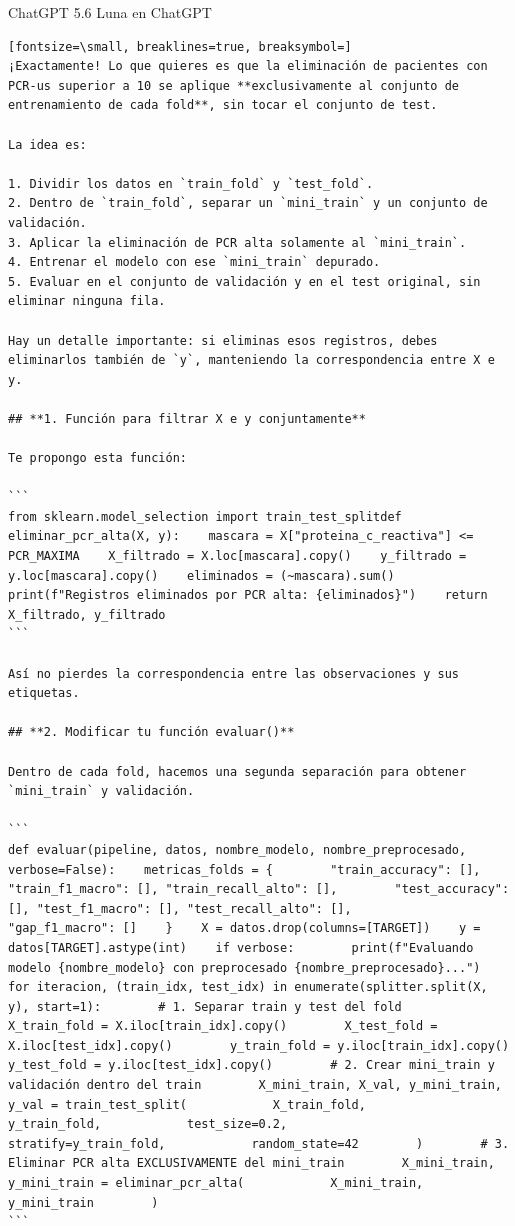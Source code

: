 \documentclass[12pt,a4paper,oneside]{book}
\begin{document}
\begin{iaresp}{ChatGPT 5.6 Luna en ChatGPT}
\begin{Verbatim}[fontsize=\small, breaklines=true, breaksymbol=]
¡Exactamente! Lo que quieres es que la eliminación de pacientes con PCR-us superior a 10 se aplique **exclusivamente al conjunto de entrenamiento de cada fold**, sin tocar el conjunto de test.

La idea es:

1. Dividir los datos en `train_fold` y `test_fold`.
2. Dentro de `train_fold`, separar un `mini_train` y un conjunto de validación.
3. Aplicar la eliminación de PCR alta solamente al `mini_train`.
4. Entrenar el modelo con ese `mini_train` depurado.
5. Evaluar en el conjunto de validación y en el test original, sin eliminar ninguna fila.

Hay un detalle importante: si eliminas esos registros, debes eliminarlos también de `y`, manteniendo la correspondencia entre X e y.

## **1. Función para filtrar X e y conjuntamente**

Te propongo esta función:

```
from sklearn.model_selection import train_test_splitdef eliminar_pcr_alta(X, y):    mascara = X["proteina_c_reactiva"] <= PCR_MAXIMA    X_filtrado = X.loc[mascara].copy()    y_filtrado = y.loc[mascara].copy()    eliminados = (~mascara).sum()    print(f"Registros eliminados por PCR alta: {eliminados}")    return X_filtrado, y_filtrado
```

Así no pierdes la correspondencia entre las observaciones y sus etiquetas.

## **2. Modificar tu función evaluar()**

Dentro de cada fold, hacemos una segunda separación para obtener `mini_train` y validación.

```
def evaluar(pipeline, datos, nombre_modelo, nombre_preprocesado, verbose=False):    metricas_folds = {        "train_accuracy": [], "train_f1_macro": [], "train_recall_alto": [],        "test_accuracy": [], "test_f1_macro": [], "test_recall_alto": [],        "gap_f1_macro": []    }    X = datos.drop(columns=[TARGET])    y = datos[TARGET].astype(int)    if verbose:        print(f"Evaluando modelo {nombre_modelo} con preprocesado {nombre_preprocesado}...")    for iteracion, (train_idx, test_idx) in enumerate(splitter.split(X, y), start=1):        # 1. Separar train y test del fold        X_train_fold = X.iloc[train_idx].copy()        X_test_fold = X.iloc[test_idx].copy()        y_train_fold = y.iloc[train_idx].copy()        y_test_fold = y.iloc[test_idx].copy()        # 2. Crear mini_train y validación dentro del train        X_mini_train, X_val, y_mini_train, y_val = train_test_split(            X_train_fold,            y_train_fold,            test_size=0.2,            stratify=y_train_fold,            random_state=42        )        # 3. Eliminar PCR alta EXCLUSIVAMENTE del mini_train        X_mini_train, y_mini_train = eliminar_pcr_alta(            X_mini_train, y_mini_train        )
```


\end{Verbatim}
\end{iaresp}
\end{document}
